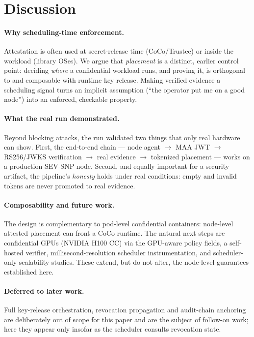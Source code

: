 \section{Discussion}
\label{sec:discussion}

\paragraph{Why scheduling-time enforcement.}
Attestation is often used at secret-release time (CoCo/Trustee) or inside the
workload (library OSes). We argue that \emph{placement} is a distinct, earlier
control point: deciding \emph{where} a confidential workload runs, and proving it,
is orthogonal to and composable with runtime key release. Making verified
evidence a scheduling signal turns an implicit assumption (``the operator put me
on a good node'') into an enforced, checkable property.

\paragraph{What the real run demonstrated.}
Beyond blocking attacks, the run validated two things that only real hardware can
show. First, the end-to-end chain --- node agent $\to$ MAA JWT $\to$ RS256/JWKS
verification $\to$ real evidence $\to$ tokenized placement --- works on
a production SEV-SNP node. Second, and equally important for a security artifact,
the pipeline's \emph{honesty} holds under real conditions: empty and invalid
tokens are never promoted to real evidence.

\paragraph{Composability and future work.}
The design is complementary to pod-level confidential containers: node-level
attested placement can front a CoCo runtime. The natural next steps are
confidential GPUs (NVIDIA H100 CC) via the GPU-aware policy fields, a
self-hosted verifier, millisecond-resolution scheduler instrumentation, and
scheduler-only scalability studies. These extend, but do not alter, the
node-level guarantees established here.

\paragraph{Deferred to later work.}
Full key-release orchestration, revocation propagation and audit-chain anchoring
are deliberately out of scope for this paper and are the subject of follow-on
work; here they appear only insofar as the scheduler consults revocation state.
